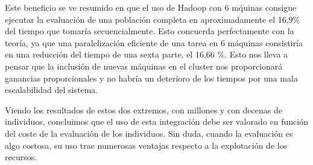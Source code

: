 Este beneficio se ve resumido en que el uso de Hadoop con 6 m\'quinas consigue ejecutar la evaluación de una población completa en aproximadamente el 16,9\% del tiempo que tomar\'ia secuencialmente. Esto concuerda perfectamente con la teoría, ya que una paralelizaci\'on eficiente de una tarea en 6 m\'aquinas consistiría en una reducción del tiempo de una sexta parte, el 
16,66 \%. Esto nos lleva a pensar que la inclusi\'on de nuevas m\'aquinas en el cluster nos proporcionar\'a ganancias proporcionales y no habr\'ia un deterioro de los tiempos por una mala escalabilidad del sistema.


Viendo los resultados de estos dos extremos, con millones y con decenas de individuos, concluimos que el uso de esta integraci\'on debe ser valorado en funci\'on del coste de la evaluaci\'on de los individuos. Sin duda, cuando la evaluaci\'on es algo costosa, su uso trae numerosas ventajas respecto a la explotaci\'on de los recursos.









